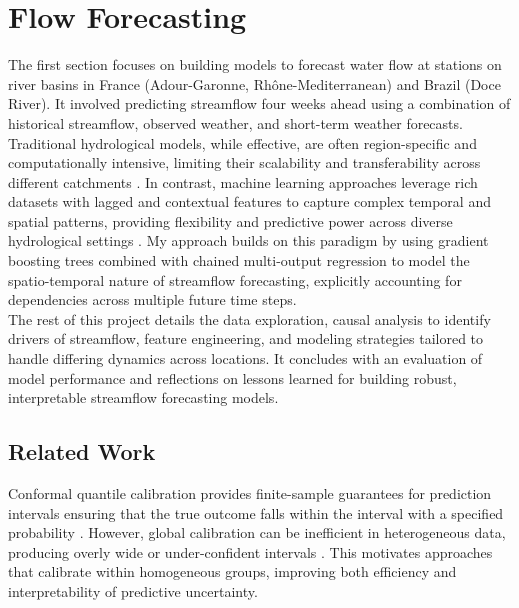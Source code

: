 \documentclass[ruler]{CUP-JNL-EDS}%
\begin{document}
\section{Flow Forecasting}
The first section focuses on building models to forecast water flow at stations on river basins in 
France (Adour-Garonne, Rhône-Mediterranean) and Brazil (Doce River). It involved 
predicting streamflow four weeks ahead using a combination of historical streamflow, 
observed weather, and short-term weather forecasts.\\ 

Traditional hydrological models, while effective, are often region-specific and computationally intensive, 
limiting their scalability and transferability across different catchments \citep{beven2012rainfall,singh1995}. 
In contrast, machine learning approaches leverage rich datasets with lagged and contextual features to 
capture complex temporal and spatial patterns, providing flexibility and predictive power across diverse 
hydrological settings \citep{mosavi2018, kratzert2019}. My approach builds on this paradigm by using gradient boosting 
trees \citep{prokhorenkova2018} combined with chained multi-output regression \citep{spyromitros2016} to model the spatio-temporal nature of streamflow forecasting, explicitly accounting for dependencies across 
multiple future time steps. \\

The rest of this project details the data exploration, causal analysis to identify drivers of streamflow, 
feature engineering, and modeling strategies tailored to handle differing dynamics across locations. 
It concludes with an evaluation of model performance and reflections on lessons learned for building 
robust, interpretable streamflow forecasting models.

\subsection{Related Work}
Conformal quantile calibration provides finite-sample guarantees for prediction intervals ensuring 
that the true outcome falls within the interval with a specified probability \citep{romano2019}.
However, global calibration can be inefficient in heterogeneous data, producing overly wide or 
under-confident intervals \citep{angebates2022}. This motivates approaches that calibrate within 
homogeneous groups, improving both efficiency and interpretability of predictive uncertainty.
\end{document}
